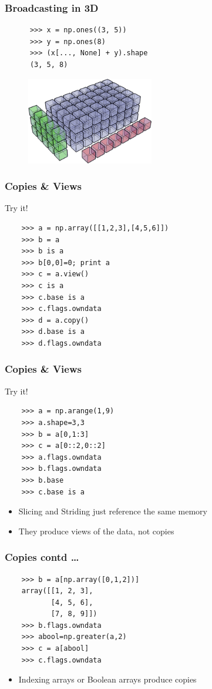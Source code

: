 \documentclass[14pt,compress]{beamer}
\newcounter{time}
\newcommand{\inctime}[1]{\addtocounter{time}{#1}{\tiny \thetime\ m}}
\begin{document}
\begin{frame}[fragile]
  \frametitle{Broadcasting in 3D}
    \begin{lstlisting}
      >>> x = np.ones((3, 5))
      >>> y = np.ones(8)
      >>> (x[..., None] + y).shape
      (3, 5, 8)
    \end{lstlisting}
    \begin{figure}
      \begin{center}
      \includegraphics[height=1.5in, interpolate=true]{data/array_3x5x8}        
      \end{center}
    \end{figure}
\end{frame}

\begin{frame}[fragile]
  \frametitle{Copies \& Views}
  Try it!
  \begin{lstlisting}
    >>> a = np.array([[1,2,3],[4,5,6]])
    >>> b = a
    >>> b is a
    >>> b[0,0]=0; print a
    >>> c = a.view()
    >>> c is a
    >>> c.base is a
    >>> c.flags.owndata
    >>> d = a.copy()
    >>> d.base is a
    >>> d.flags.owndata
  \end{lstlisting}
\end{frame}

\begin{frame}[fragile]
  \frametitle{Copies \& Views}
  Try it!
  \begin{lstlisting}
    >>> a = np.arange(1,9)
    >>> a.shape=3,3
    >>> b = a[0,1:3]
    >>> c = a[0::2,0::2]
    >>> a.flags.owndata
    >>> b.flags.owndata
    >>> b.base
    >>> c.base is a
  \end{lstlisting}
  \begin{itemize}
  \item Slicing and Striding just reference the same memory
  \item They produce views of the data, not copies
  \end{itemize}
\end{frame}

\begin{frame}[fragile]
  \frametitle{Copies contd \ldots}
  \begin{lstlisting}
    >>> b = a[np.array([0,1,2])]
    array([[1, 2, 3],
           [4, 5, 6],
           [7, 8, 9]])
    >>> b.flags.owndata
    >>> abool=np.greater(a,2)
    >>> c = a[abool]
    >>> c.flags.owndata
  \end{lstlisting}
  \begin{itemize}
  \item Indexing arrays or Boolean arrays produce copies
  \end{itemize}
\inctime{15}
\end{frame}
\end{document}
